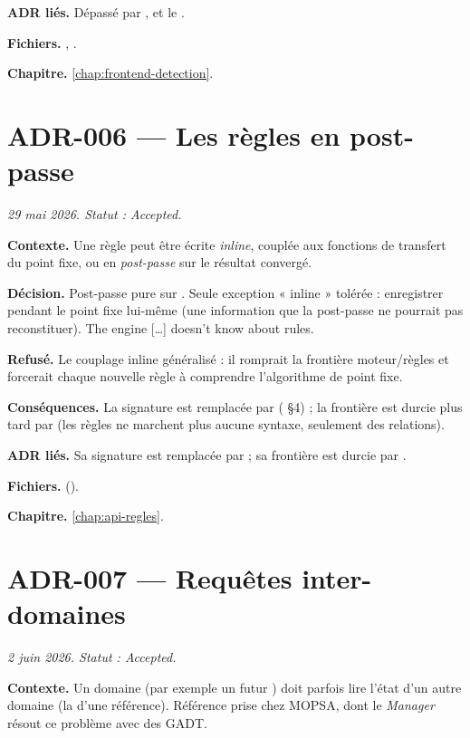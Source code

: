 \textbf{ADR liés.} Dépassé par ,  et le .

\textbf{Fichiers.} , .

\textbf{Chapitre.} \cref{chap:frontend-detection}.

\section{ADR-006 --- Les règles en post-passe}
\label{adr:6}
\noindent\textit{29 mai 2026. Statut : Accepted.}

\textbf{Contexte.} Une règle peut être écrite \emph{inline}, couplée aux
fonctions de transfert du point fixe, ou en \emph{post-passe} sur le résultat
convergé.

\textbf{Décision.} Post-passe pure sur . Seule exception
« inline » tolérée : enregistrer  pendant le point fixe
lui-même (une information que la post-passe ne pourrait pas reconstituer).
\og The engine […] doesn't know about rules\fg{}.

\textbf{Refusé.} Le couplage inline généralisé : il romprait la frontière
moteur/règles et forcerait chaque nouvelle règle à comprendre l'algorithme de
point fixe.

\textbf{Conséquences.} La signature 
est remplacée par  ( §4) ; la frontière est
durcie plus tard par  (les règles ne marchent plus aucune syntaxe,
seulement des relations).

\textbf{ADR liés.} Sa signature est remplacée par  ; sa frontière est
durcie par .

\textbf{Fichiers.}  ().

\textbf{Chapitre.} \cref{chap:api-regles}.

\section{ADR-007 --- Requêtes inter-domaines}
\label{adr:7}
\noindent\textit{2 juin 2026. Statut : Accepted.}

\textbf{Contexte.} Un domaine (par exemple un futur ) doit
parfois lire l'état d'un autre domaine (la  d'une référence).
Référence prise chez MOPSA, dont le \emph{Manager} résout ce problème avec des
GADT.

